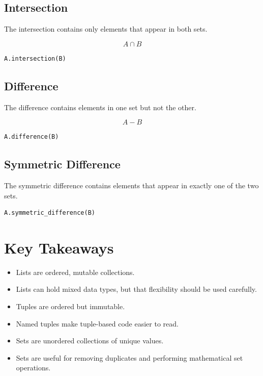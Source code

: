 \documentclass[11pt]{article}
\begin{document}
\subsection{Intersection}

The intersection contains only elements that appear in both sets.

\[
A \cap B
\]

\begin{lstlisting}[language=Python]
A.intersection(B)
\end{lstlisting}

\subsection{Difference}

The difference contains elements in one set but not the other.

\[
A - B
\]

\begin{lstlisting}[language=Python]
A.difference(B)
\end{lstlisting}

\subsection{Symmetric Difference}

The symmetric difference contains elements that appear in exactly one of the two sets.

\begin{lstlisting}[language=Python]
A.symmetric_difference(B)
\end{lstlisting}

\section{Key Takeaways}

\begin{itemize}
    \item Lists are ordered, mutable collections.
    \item Lists can hold mixed data types, but that flexibility should be used carefully.
    \item Tuples are ordered but immutable.
    \item Named tuples make tuple-based code easier to read.
    \item Sets are unordered collections of unique values.
    \item Sets are useful for removing duplicates and performing mathematical set operations.
\end{itemize}
\end{document}
